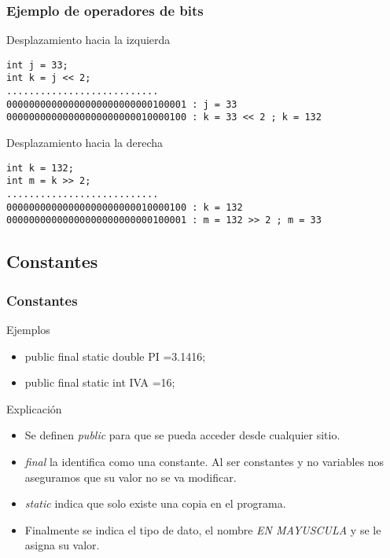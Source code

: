 \documentclass{beamer}
\begin{document}
\begin{frame}[fragile]
\frametitle{Ejemplo de operadores de bits}
Desplazamiento hacia la izquierda
\begin{verbatim}
int j = 33;
int k = j << 2;
...........................
00000000000000000000000000100001 : j = 33
00000000000000000000000010000100 : k = 33 << 2 ; k = 132   
\end{verbatim}
\pause
Desplazamiento hacia la derecha
\begin{verbatim}
int k = 132;
int m = k >> 2;
...........................
00000000000000000000000010000100 : k = 132    
00000000000000000000000000100001 : m = 132 >> 2 ; m = 33
\end{verbatim}
\end{frame}


\subsection{Constantes}
\begin{frame}
\frametitle{Constantes}
\begin{block}{Ejemplos}
\begin{itemize}[<+-| alert@+>]
\item public final static double PI =3.1416;
\item public final static int IVA =16;
\end{itemize}
\end{block}
\pause
\begin{block}{Explicación}
\begin{itemize}[<+-| alert@+>]
\item Se definen \emph{public} para que se pueda acceder desde cualquier sitio.
\item \emph{final} la identifica como una constante. Al ser constantes y no variables nos aseguramos que su valor no se va modificar.
\item \emph{static} indica que solo existe una copia en el programa. 
\item Finalmente se indica el tipo de dato, el nombre \emph{EN MAYUSCULA} y se le asigna su valor.
\end{itemize}
\end{block}
\pause

\end{frame}
\end{document}
